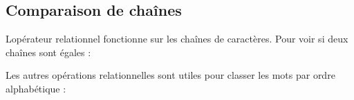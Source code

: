 \begin{Shaded}
\begin{Highlighting}[]
\OperatorTok{\textgreater{}\textgreater{}\textgreater{}}   
\OperatorTok{\textgreater{}\textgreater{}\textgreater{}}   
\end{Highlighting}
\end{Shaded}

\hypertarget{comparaison-de-chauxeenes}{%
\subsection{Comparaison de chaînes}\label{comparaison-de-chauxeenes}}

L\textquotesingle opérateur relationnel fonctionne sur les chaînes de
caractères. Pour voir si deux chaînes sont égales :

\begin{Shaded}
\begin{Highlighting}[]
\OperatorTok{==} \NormalTok{:}
    \NormalTok{(}\NormalTok{)}
\end{Highlighting}
\end{Shaded}

Les autres opérations relationnelles sont utiles pour classer les mots
par ordre alphabétique :

\begin{Shaded}
\begin{Highlighting}[]
\OperatorTok{\textless{}} \NormalTok{:}
    \NormalTok{(} \OperatorTok{+}\OperatorTok{+} \NormalTok{)}
\OperatorTok{\textgreater{}} \NormalTok{:}
    \NormalTok{(} \OperatorTok{+}\OperatorTok{+} \NormalTok{)}
\NormalTok{:}
    \NormalTok{(}\NormalTok{)}
\end{Highlighting}
\end{Shaded}

